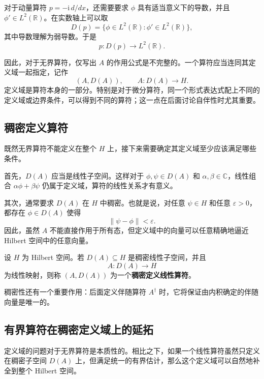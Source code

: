 \documentclass[UTF8,a4paper,11pt,openany]{ctexbook}
\begin{document}
对于动量算符 $p=-\mathrm{i}\,d/dx$，还需要要求 $\phi$ 具有适当意义下的导数，并且 $\phi'\in L^2(\mathbb R)$。在实数轴上可以取
\begin{equation}
    D(p)
    =
    \{\phi\in L^2(\mathbb R):
    \phi'\in L^2(\mathbb R)\},
\end{equation}
其中导数理解为弱导数。于是
\[
p:D(p)\to L^2(\mathbb R).
\]

因此，对于无界算符，仅写出 $A$ 的作用公式是不完整的。一个算符应当连同其定义域一起指定，记作
\[
(A,D(A)),
\qquad
A:D(A)\to H.
\]
定义域是算符本身的一部分。特别是对于微分算符，同一个形式表达式配上不同的定义域或边界条件，可以得到不同的算符；这一点在后面讨论自伴性时尤其重要。

\subsection{稠密定义算符}

既然无界算符不能定义在整个 $H$ 上，接下来需要确定其定义域至少应该满足哪些条件。

首先，$D(A)$ 应当是线性子空间。这样对于 $\phi,\psi\in D(A)$ 和 $\alpha,\beta\in\mathbb C$，线性组合 $\alpha\phi+\beta\psi$ 仍属于定义域，算符的线性关系才有意义。

其次，通常要求 $D(A)$ 在 $H$ 中稠密。也就是说，对任意 $\psi\in H$ 和任意 $\varepsilon>0$，都存在 $\phi\in D(A)$ 使得
\[
\|\psi-\phi\|<\varepsilon.
\]
因此，虽然 $A$ 不能直接作用于所有态，但定义域中的向量可以任意精确地逼近 Hilbert 空间中的任意向量。

\begin{definition}[稠密定义线性算符]
设 $H$ 为 Hilbert 空间。若 $D(A)\subseteq H$ 是稠密线性子空间，并且
\[
A:D(A)\to H
\]
为线性映射，则称 $(A,D(A))$ 为一个\textbf{稠密定义线性算符}。
\end{definition}

稠密性还有一个重要作用：后面定义伴随算符 $A^\dagger$ 时，它将保证由内积确定的伴随向量是唯一的。

\subsection{有界算符在稠密定义域上的延拓}

定义域的问题对于无界算符是本质性的。相比之下，如果一个线性算符虽然只定义在稠密子空间 $D(A)$ 上，但满足统一的有界估计，那么这个定义域可以自然地补全到整个 Hilbert 空间。
\end{document}
